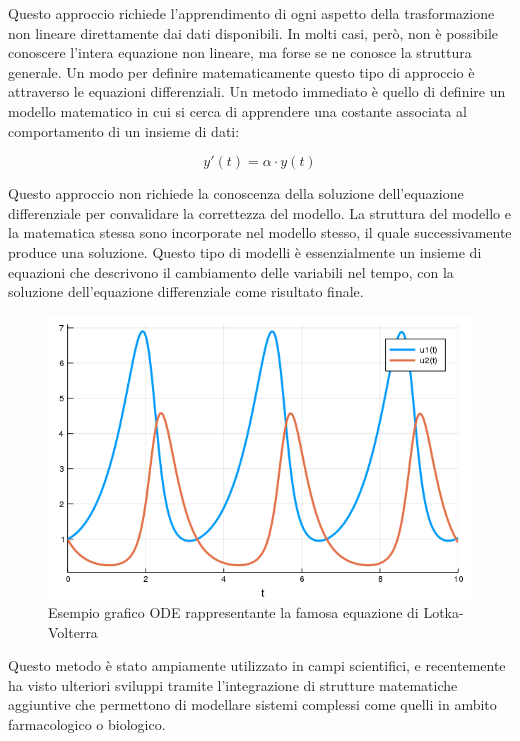 Questo approccio richiede l'apprendimento di ogni aspetto della 
trasformazione non lineare direttamente dai dati disponibili. 
In molti casi, però, non è possibile conoscere l'intera equazione non 
lineare, ma forse se ne conosce la struttura generale. Un modo per 
definire matematicamente questo tipo di approccio è attraverso le 
equazioni differenziali. Un metodo immediato è quello di definire un 
modello matematico in cui si cerca di apprendere una costante associata al 
comportamento di un insieme di dati:

$$y'(t) = \alpha \cdot y(t)$$

Questo approccio non richiede la conoscenza della soluzione dell'equazione 
differenziale per convalidare la correttezza del modello. La struttura del 
modello e la matematica stessa sono incorporate nel modello stesso, il 
quale successivamente produce una soluzione. Questo tipo di modelli è 
essenzialmente un insieme di equazioni che descrivono il cambiamento 
delle variabili nel tempo, con la soluzione dell'equazione differenziale 
come risultato finale.

\begin{figure}[H]
    \begin{center}
        \includegraphics[width=\textwidth]{img/lotkavolterra.png}
        \caption{Esempio grafico ODE rappresentante la famosa equazione di Lotka-Volterra}
        \label{fig:lotkavolterra_example}
    \end{center}
\end{figure}

Questo metodo è stato ampiamente utilizzato in campi scientifici, e 
recentemente ha visto ulteriori sviluppi tramite l'integrazione di 
strutture matematiche aggiuntive che permettono di modellare sistemi 
complessi come quelli in ambito farmacologico o biologico.


